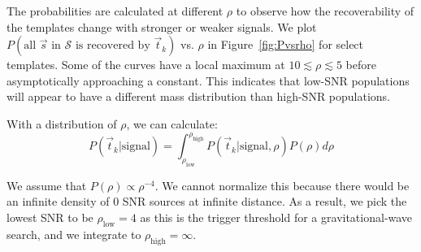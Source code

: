 \documentclass[twocolumn,showpacs,unsortedaddress,superscriptaddress,showkeys,nofootinbib,preprintnumbers,letterpaper]{revtex4-1}
\begin{document}
The probabilities are calculated at different $\rho$ to observe how the recoverability of the templates change with stronger or weaker signals. We plot $P(\text{all $\vec{s}$ in $\mathcal{S}$ is recovered by $\vec{t}_k$})$ vs. $\rho$ in Figure~\ref{fig:Pvsrho} for select templates. Some of the curves have a local maximum at $10\lesssim \rho\lesssim 5$ before asymptotically approaching a constant. This indicates that low-SNR populations will appear to have a different mass distribution than high-SNR populations.

With a distribution of $\rho$, we can calculate:
	\begin{equation}
	P(\vec{t}_k|\text{signal}) = \int_{\rho_{\text{low}}}^{\rho_{\text{high}}} P(\vec{t}_k|\text{signal},\rho) P(\rho) d\rho
	\end{equation}

We assume that $P(\rho)\propto\rho^{-4}$. We cannot normalize this because there would be an infinite density of 0 SNR sources at infinite distance. As a result, we pick the lowest SNR to be $\rho_{\text{low}}=4$ as this is the trigger threshold for a gravitational-wave search, and we integrate to $\rho_{\text{high}}=\infty$.
\end{document}
